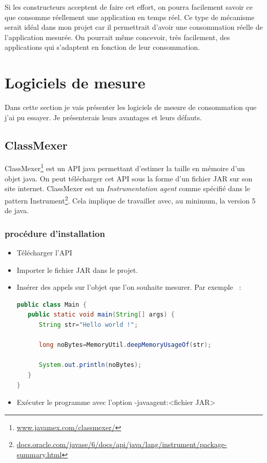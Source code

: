 \documentclass[a4paper, 11pt]{report}
\begin{document}
Si les constructeurs acceptent de faire cet effort, on pourra facilement savoir ce que consomme réellement une application en temps réel. Ce type de mécanisme serait idéal dans mon projet car il permettrait d'avoir une consommation réelle de l'application mesurée. On pourrait même concevoir, très facilement, des applications qui s'adaptent en fonction de leur consommation.

	\section{Logiciels de mesure}
Dans cette section je vais présenter les logiciels de mesure de consommation que j'ai pu essayer. Je présenterais leurs avantages et leurs défauts.
		\subsection{ClassMexer}
ClassMexer\footnote{\href{http://www.javamex.com/classmexer/}{www.javamex.com/classmexer/}} est un API java permettant d’estimer la taille en mémoire d’un objet java. On peut télécharger cet API sous la forme d’un fichier JAR sur son site internet. ClassMexer est un \textit{Instrumentation agent} comme spécifié dans le pattern Instrument\footnote{\href{http://docs.oracle.com/javase/6/docs/api/java/lang/instrument/package-summary.html}{docs.oracle.com/javase/6/docs/api/java/lang/instrument/package-summary.html}}. Cela implique de travailler avec, au minimum, la version 5 de java.

			\subsubsection{procédure d'installation}
\begin{itemize}
	\item Télécharger l’API
	\item Importer le fichier JAR dans le projet.
	\item Insérer des appels sur l’objet que l’on souhaite mesurer. Par exemple ~:
\begin{lstlisting}[language=Java]
public class Main {
   public static void main(String[] args) {
      String str="Hello world !";

      long noBytes=MemoryUtil.deepMemoryUsageOf(str);

      System.out.println(noBytes);
   }
}
\end{lstlisting}
	\item Exécuter le programme avec l’option -javaagent:<fichier JAR>
\end{itemize}
\end{document}
